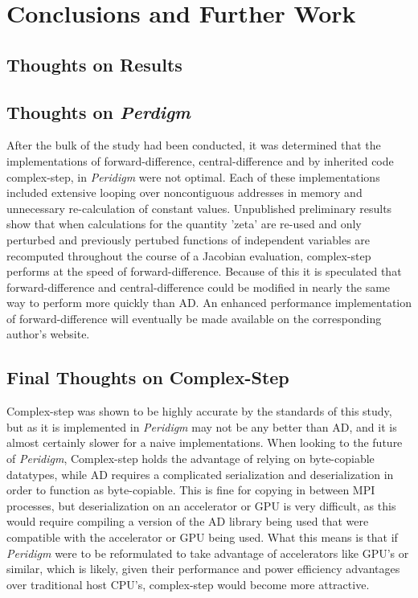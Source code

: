 \documentclass[preprint,12pt]{elsarticle}
\begin{document}
\section{Conclusions and Further Work}

\subsection{Thoughts on Results}


\subsection{Thoughts on \emph{Perdigm}}

After the bulk of the study had been conducted, it was determined that the implementations of
forward-difference, central-difference and by inherited code complex-step, in \emph{Peridigm} were
not optimal. Each of these implementations included extensive looping over noncontiguous addresses
in memory and unnecessary re-calculation of constant values. Unpublished preliminary results show
that when calculations for the quantity 'zeta' are re-used and only perturbed and previously
pertubed functions of independent variables are recomputed throughout the course of a Jacobian
evaluation, complex-step performs at the speed of forward-difference. Because of this it is
speculated that forward-difference and central-difference could be modified in nearly the same way to
perform more quickly than AD. An enhanced performance implementation of forward-difference will
eventually be made available on the corresponding author's website.

\subsection{Final Thoughts on Complex-Step}
Complex-step was shown to be highly accurate by the standards of this study, but as it is
implemented in \emph{Peridigm} may not be any better than AD, and it is almost certainly slower for
a naive implementations. When looking to the future of \emph{Peridigm}, Complex-step holds the
advantage of relying on byte-copiable datatypes, while AD requires a complicated serialization and
deserialization in order to function as byte-copiable. This is fine for copying in between MPI
processes, but deserialization on an accelerator or GPU is very difficult, as this would require
compiling a version of the AD library being used that were compatible with the accelerator or GPU
being used. What this means is that if \emph{Peridigm} were to be reformulated to take advantage of
accelerators like GPU's or similar, which is likely, given their performance and power efficiency
advantages over traditional host CPU's, complex-step would become more attractive.
\end{document}

